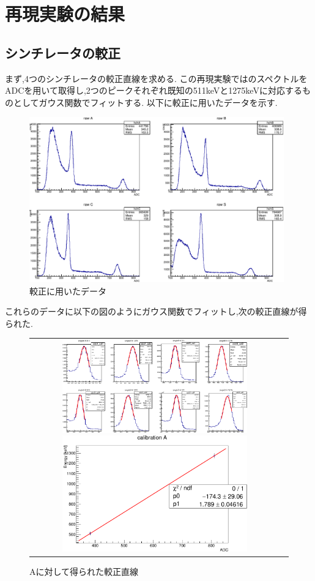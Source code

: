 \section{再現実験の結果}

\subsection{シンチレータの較正}
まず,4つのシンチレータの較正直線を求める.
この再現実験ではのスペクトルをADCを用いて取得し,2つのピークそれぞれ既知の511keVと1275keVに対応するものとしてガウス関数でフィットする.
以下に較正に用いたデータを示す.
\begin{figure}[H]
	\centering
		\includegraphics[width=11cm]{fig/isb/cal7001.pdf}
		\caption{較正に用いたデータ}
		\label{fig:calibration_raw_data}
\end{figure}
これらのデータに以下の図のようにガウス関数でフィットし,次の較正直線が得られた.
\begin{figure}[htbp]
	\begin{tabular}{cc}
		\begin{minipage}{0.5\hsize}
			\centering
				\includegraphics[width=80mm]{fig/isb/gaussFit.pdf}
				\caption{ガウス関数によるフィッティング}
				\label{fig:cal_gauss}
		\end{minipage}
		\begin{minipage}{0.5\hsize}
			\centering
				\includegraphics[width=80mm]{fig/isb/fitA.pdf}
				\caption{Aに対して得られた較正直線}
				\label{fig:fitA}
		\end{minipage}
	\end{tabular}
\end{figure}
